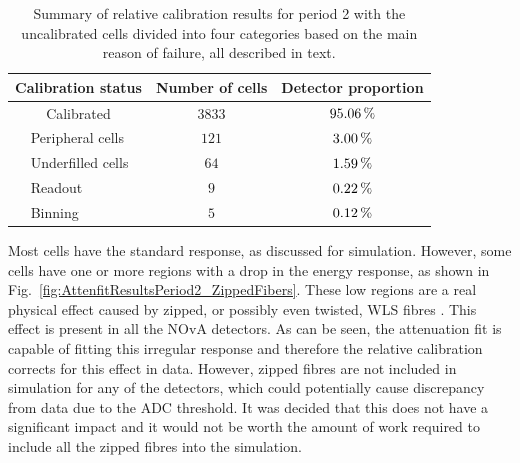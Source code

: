 \begin{table}[!hbtp]
\centering
\caption[Summary of relative calibration results for period 2]{Summary of relative calibration results for period 2 with the uncalibrated cells divided into four categories based on the main reason of failure, all described in text.}
\def\arraystretch{1.4}
\begin{tabular}{|cl|c|c|}
\hline
\multicolumn{2}{|c|}{\textbf{Calibration status}} & \textbf{Number of cells} & \textbf{Detector proportion}\\\hline
\multicolumn{2}{|c|}{Calibrated} & $3833$ & $\unit[95.06]{\%}$\\\hline
\parbox[t]{2mm}{} & Peripheral cells & $121$ & $\unit[3.00]{\%}$\\
 & Underfilled cells & $64$ & $\unit[1.59]{\%}$\\
 & Readout & $9$ & $\unit[0.22]{\%}$\\
 & Binning & $5$ & $\unit[0.12]{\%}$\\\hline
\end{tabular}
\label{tab:TestBeamPeriod2RelCalibResults}
\end{table}

Most cells have the standard response, as discussed for simulation. However, some cells have one or more regions with a drop in the energy response, as shown in Fig.~\ref{fig:AttenfitResultsPeriod2_ZippedFibers}. These low regions are a real physical effect caused by zipped, or possibly even twisted, \gls{WLS} fibres \cite{NOvA-doc-43249}. This effect is present in all the \gls{NOvA} detectors. As can be seen, the attenuation fit is capable of fitting this irregular response and therefore the relative calibration corrects for this effect in data. However, zipped fibres are not included in simulation for any of the detectors, which could potentially cause discrepancy from data due to the \gls{ADC} threshold. It was decided that this does not have a significant impact and it would not be worth the amount of work required to include all the zipped fibres into the simulation.

